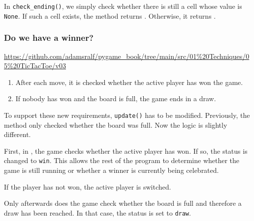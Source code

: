 
In \texttt{check\_ending()}, we simply check whether there is still a cell whose value is \texttt{None}. If such a cell exists, the method returns \false{}. Otherwise, it returns \true{}.





\subsubsection{Do we have a winner?}
\begin{diskbox}
	\url{https://github.com/adamsralf/pygame_book/tree/main/src/01%20Techniques/05%20TicTacToe/v03}
\end{diskbox}

\begin{enumerate}
	\item After each move, it is checked whether the active player has won the game.\label{reqTicTacToeWinOrDrawWin}

	\item If nobody has won and the board is full, the game ends in a draw.\label{reqTicTacToeWinOrDrawDraw}
\end{enumerate}
\er

To support these new requirements, \texttt{update()} has to be modified. Previously, the method only checked whether the board was full. Now the logic is slightly different.

First, in , the game checks whether the active player has won. If so, the status is changed to \texttt{win}. This allows the rest of the program to determine whether the game is still running or whether a winner is currently being celebrated.

If the player has not won, the active player is switched.

Only afterwards does the game check whether the board is full and therefore a draw has been reached. In that case, the status is set to \texttt{draw}.



